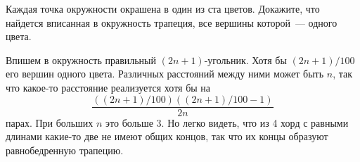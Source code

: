 \problem
Каждая точка окружности окрашена в один из ста цветов.
Докажите, что найдется вписанная в окружность трапеция, все вершины которой~---
одного цвета.

\solution
Впишем в окружность правильный $(2 n + 1)$-угольник.
Хотя бы $(2 n + 1) / 100$ его вершин одного цвета.
Различных расстояний между ними может быть $n$, так что какое-то расстояние
реализуется хотя бы на
\[
    \dfrac{((2 n + 1) / 100)((2 n + 1) / 100 - 1)}{2 n}
\]
парах.
При больших $n$ это больше 3.
Но легко видеть, что из 4 хорд с равными длинами какие-то две не имеют общих
концов, так что их концы образуют равнобедренную трапецию.

\endproblem
